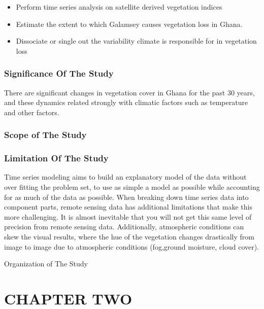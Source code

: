 \documentclass[
  letterpaper,
  DIV=11,
  numbers=noendperiod]{scrartcl}
\begin{document}
\begin{itemize}
\item
  Perform time series analysis on satellite derived vegetation indices
\item
  Estimate the extent to which Galamsey causes vegetation loss in Ghana.
\item
  Dissociate or single out the variability climate is responsible for in
  vegetation loss
\end{itemize}

\hypertarget{significance-of-the-study}{%
\subsubsection{Significance Of The
Study}\label{significance-of-the-study}}

There are significant changes in vegetation cover in Ghana for the past
30 years, and these dynamics related strongly with climatic factors such
as temperature and other factors.

\hypertarget{scope-of-the-study}{%
\subsubsection{Scope of The Study}\label{scope-of-the-study}}

\hypertarget{limitation-of-the-study}{%
\subsubsection{Limitation Of The Study}\label{limitation-of-the-study}}

Time series modeling aims to build an explanatory model of the data
without over fitting the problem set, to use as simple a model as
possible while accounting for as much of the data as possible. When
breaking down time series data into component parts, remote sensing data
has additional limitations that make this more challenging. It is almost
inevitable that you will not get this same level of precision from
remote sensing data. Additionally, atmospheric conditions can skew the
visual results, where the hue of the vegetation changes drastically from
image to image due to atmospheric conditions (fog,ground moisture, cloud
cover).

Organization of The Study

\hypertarget{chapter-two}{%
\section{CHAPTER TWO}\label{chapter-two}}
\end{document}
